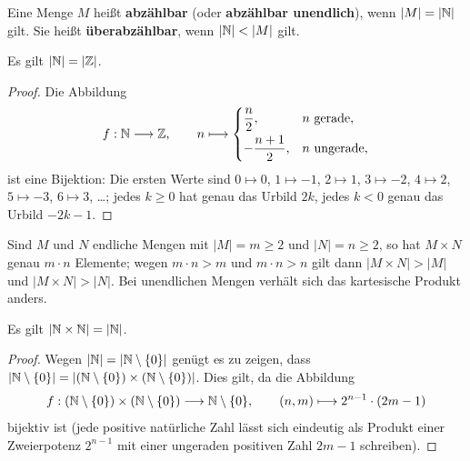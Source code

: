 \begin{definition}
Eine Menge $M$ heißt \textbf{abzählbar} (oder \textbf{abzählbar unendlich}),
wenn $|M|=|\mathbb{N}|$ gilt.
Sie heißt \textbf{überabzählbar}, wenn $|\N|<|M|$ gilt.
\end{definition}

\begin{satz}
Es gilt $|\mathbb{N}|=|\mathbb{Z}|$.
\end{satz}
\begin{proof}
Die Abbildung
\[
    f:\mathbb{N}\longrightarrow\mathbb{Z},\qquad
    n\longmapsto\begin{cases}
        \dfrac{n}{2}, & n\text{ gerade},\\[0.6em]
        -\dfrac{n+1}{2}, & n\text{ ungerade},
    \end{cases}
\]
ist eine Bijektion: Die ersten Werte sind
$0\mapsto0$, $1\mapsto-1$, $2\mapsto1$, $3\mapsto-2$, $4\mapsto2$,
$5\mapsto-3$, $6\mapsto3$, \dots; jedes $k\ge0$ hat genau das Urbild $2k$,
jedes $k<0$ genau das Urbild $-2k-1$.
\end{proof}

\begin{bemerkung}
Sind $M$ und $N$ endliche Mengen mit $|M|=m\ge2$ und $|N|=n\ge2$,
so hat $M\times N$ genau $m\cdot n$ Elemente; wegen $m\cdot n>m$ und
$m\cdot n>n$ gilt dann $|M\times N|>|M|$ und $|M\times N|>|N|$.
Bei unendlichen Mengen verhält sich das kartesische Produkt anders.
\end{bemerkung}

\begin{satz}
Es gilt $|\mathbb{N}\times\mathbb{N}|=|\mathbb{N}|$.
\end{satz}
\begin{proof}
Wegen $|\mathbb{N}|=|\mathbb{N}\setminus\{0\}|$ genügt es zu zeigen, dass
$|\mathbb{N}\setminus\{0\}|=|(\mathbb{N}\setminus\{0\})\times(\mathbb{N}\setminus\{0\})|$.
Dies gilt, da die Abbildung
\[
    f:(\mathbb{N}\setminus\{0\})\times(\mathbb{N}\setminus\{0\})\longrightarrow\mathbb{N}\setminus\{0\},
    \qquad (n,m)\longmapsto 2^{n-1}\cdot(2m-1)
\]
bijektiv ist (jede positive natürliche Zahl lässt sich eindeutig als
Produkt einer Zweierpotenz $2^{n-1}$ mit einer ungeraden positiven Zahl
$2m-1$ schreiben).
\end{proof}

